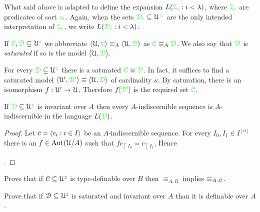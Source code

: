 What said above is adapted to define the expansion  \emph{$L({\color{green}\EuScript Z_i}:i<\lambda)$,} where ${\color{green}\EuScript Z_i}$ are predicates of sort ${\color{green} z_i}$.
Again, when the sets ${\color{green}\EuScript D_i}\subseteq\EuScript U^{\color{green} z_i}$ are the only intended interpretation of  ${\color{green}\EuScript Z_i}$, we write \emph{$L({\color{green}\EuScript D_i}:i<\lambda)$.}

\begin{definition}\label{def_ins_sat}
  If ${\color{green}\EuScript C},{\color{green}\EuScript D}\subseteq\EuScript U^{\color{green} z}$ we abbreviate $\langle\EuScript U,{\color{green}\EuScript C}\rangle\equiv_A\langle\EuScript U,{\color{green}\EuScript D}\rangle$ as ${\color{green}\EuScript C}\equiv_A{\color{green}\EuScript D}$.
We also say that ${\color{green}\EuScript D}$ is \emph{saturated\/} if so is the model $\langle\EuScript U,{\color{green}\EuScript D}\rangle$.
\end{definition}

\begin{remark}\label{rem_el_sat}
For every ${\color{green}\EuScript D}\subseteq\EuScript U^{\color{green} z}$ there is a saturated ${\color{green}\EuScript C}\equiv{\color{green}\EuScript D}$.
In fact, it suffices to find a saturated model $\langle\EuScript U',{\color{green}\EuScript D'}\rangle\equiv\langle\EuScript U,{\color{green}\EuScript D}\rangle$ of cardinality $\kappa$.
By saturation, there is an isomorphism $f:\EuScript U'\to\EuScript U$.
Therefore $f[{\color{green}\EuScript D'}]$ is the required set ${\color{green}\EuScript C}$.
\end{remark}

\begin{proposition}\label{prop_indiscernible_L(A,D)}
  If ${\color{green}\EuScript D}\subseteq\EuScript U^{\color{green} z}$ is invariant over $A$ then every $A$-indiscernible sequence is $A$-indiscernible in the language $L({\color{green}\EuScript D})$.
\end{proposition}

\begin{proof}
  Let $\bar c=\langle c_i:i\in I\rangle$ be an $A$-indiscernible sequence.
  For every $I_0,I_1\in I^{[n]}$ there is an $f\in{\rm Aut\kern.15ex}(\EuScript U/A)$ such that $fc_{\restriction I_0}=c_{\restriction I_1}$, Hence 

  .
\end{proof}

\begin{exercise}
  Prove that if $\EuScript C\subseteq\EuScript U^z$ is type-definable over $B$ then $\equiv_{A,B}$ implies $\equiv_{A\,;\EuScript C}$.
\end{exercise} 

\begin{exercise}
  Prove that if $\EuScript D\subseteq\EuScript U^z$ is saturated and invariant over $A$ than it is definable over $A$.
\end{exercise} 

